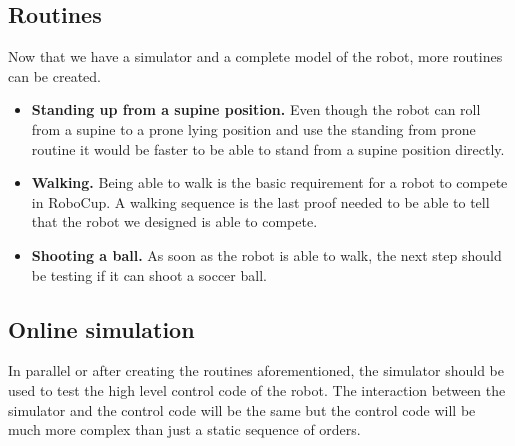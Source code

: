 \subsection{Routines}
Now that we have a simulator and a complete model of the robot, more routines can be created. 
\begin{itemize}
\item \textbf{Standing up from a supine position.} Even though the robot can roll from a supine to a prone lying position and use the standing from prone routine it would be faster to be able to stand from a supine position directly.

\item \textbf{Walking.} Being able to walk is the basic requirement for a robot to compete in RoboCup. A walking sequence is the last proof needed to be able to tell that the robot we designed is able to compete.

\item \textbf{Shooting a ball.} As soon as the robot is able to walk, the next step should be testing if it can shoot a soccer ball.
\end{itemize}

\subsection{Online simulation}
In parallel or after creating the routines aforementioned, the simulator should be used to test the high level control code of the robot. The interaction between the simulator and the control code will be the same but the control code will be much more complex than just a static sequence of orders.

